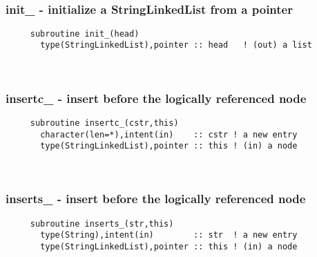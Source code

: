 \mbox{}\hrulefill\ 
 

  \subsubsection{init\_ - initialize a StringLinkedList from a pointer}

\begin{verbatim} 
     subroutine init_(head)
       type(StringLinkedList),pointer :: head	! (out) a list
 \end{verbatim}%
 
 
\mbox{}\hrulefill\ 
 
  \subsubsection{insertc\_ - insert before the logically referenced node}

\begin{verbatim} 
     subroutine insertc_(cstr,this)
       character(len=*),intent(in)    :: cstr ! a new entry
       type(StringLinkedList),pointer :: this ! (in) a node
 \end{verbatim}%
 
 
\mbox{}\hrulefill\ 
 
  \subsubsection{inserts\_ - insert before the logically referenced node}

\begin{verbatim} 
     subroutine inserts_(str,this)
       type(String),intent(in)        :: str  ! a new entry
       type(StringLinkedList),pointer :: this ! (in) a node
 \end{verbatim}%
 
